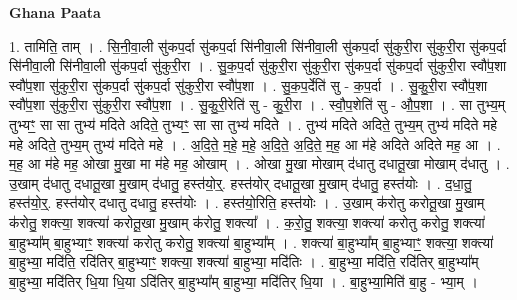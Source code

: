 \documentclass[17pt]{extarticle}
\begin{document}
\textbf{Ghana Paata } \newline

1. तामिति॒ ताम् । . सि॒नी॒वा॒ली सु॑कप॒र्दा सु॑कप॒र्दा सि॑नीवा॒ली सि॑नीवा॒ली सु॑कप॒र्दा सु॑कुरी॒रा सु॑कुरी॒रा सु॑कप॒र्दा सि॑नीवा॒ली सि॑नीवा॒ली सु॑कप॒र्दा सु॑कुरी॒रा । . सु॒क॒प॒र्दा सु॑कुरी॒रा सु॑कुरी॒रा सु॑कप॒र्दा सु॑कप॒र्दा सु॑कुरी॒रा स्वौ॑प॒शा स्वौ॑प॒शा सु॑कुरी॒रा सु॑कप॒र्दा सु॑कप॒र्दा सु॑कुरी॒रा स्वौ॑प॒शा । . सु॒क॒प॒र्देति॑ सु - क॒प॒र्दा । . सु॒कु॒री॒रा स्वौ॑प॒शा स्वौ॑प॒शा सु॑कुरी॒रा सु॑कुरी॒रा स्वौ॑प॒शा । . सु॒कु॒री॒रेति॑ सु - कु॒री॒रा । . स्वौ॒प॒शेति॑ सु - औ॒प॒शा । . सा तुभ्य॒म् तुभ्यꣳ॒॒ सा सा तुभ्य॑ मदिते अदिते॒ तुभ्यꣳ॒॒ सा सा तुभ्य॑ मदिते । . तुभ्य॑ मदिते अदिते॒ तुभ्य॒म् तुभ्य॑ मदिते महे महे अदिते॒ तुभ्य॒म् तुभ्य॑ मदिते महे । . अ॒दि॒ते॒ म॒हे॒ म॒हे॒ अ॒दि॒ते॒ अ॒दि॒ते॒ म॒ह॒ आ म॑हे अदिते अदिते मह॒ आ । . म॒ह॒ आ म॑हे मह॒ ओखा मु॒खा मा म॑हे मह॒ ओखाम् । . ओखा मु॒खा मोखाम् द॑धातु दधातू॒खा मोखाम् द॑धातु । . उ॒खाम् द॑धातु दधातू॒खा मु॒खाम् द॑धातु॒ हस्त॑यो॒र्॒. हस्त॑योर् दधातू॒खा मु॒खाम् द॑धातु॒ हस्त॑योः । . द॒धा॒तु॒ हस्त॑यो॒र्॒. हस्त॑योर् दधातु दधातु॒ हस्त॑योः । . हस्त॑यो॒रिति॒ हस्त॑योः । . उ॒खाम् क॑रोतु करोतू॒खा मु॒खाम् क॑रोतु॒ शक्त्या॒ शक्त्या॑ करोतू॒खा मु॒खाम् क॑रोतु॒ शक्त्या᳚ । . क॒रो॒तु॒ शक्त्या॒ शक्त्या॑ करोतु करोतु॒ शक्त्या॑ बा॒हुभ्या᳚म् बा॒हुभ्याꣳ॒॒ शक्त्या॑ करोतु करोतु॒ शक्त्या॑ बा॒हुभ्या᳚म् । . शक्त्या॑ बा॒हुभ्या᳚म् बा॒हुभ्याꣳ॒॒ शक्त्या॒ शक्त्या॑ बा॒हुभ्या॒ मदि॑ति॒ रदि॑तिर् बा॒हुभ्याꣳ॒॒ शक्त्या॒ शक्त्या॑ बा॒हुभ्या॒ मदि॑तिः । . बा॒हुभ्या॒ मदि॑ति॒ रदि॑तिर् बा॒हुभ्या᳚म् बा॒हुभ्या॒ मदि॑तिर् धि॒या धि॒या ऽदि॑तिर् बा॒हुभ्या᳚म् बा॒हुभ्या॒ मदि॑तिर् धि॒या । . बा॒हुभ्या॒मिति॑ बा॒हु - भ्या॒म् । \newline
\end{document}
